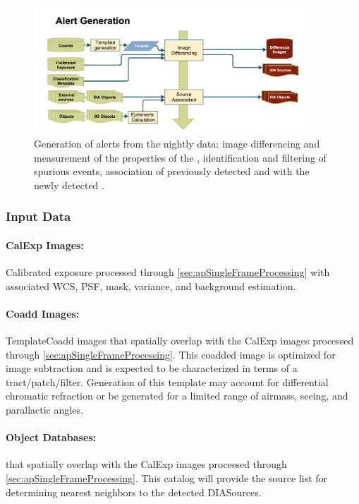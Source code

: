 \begin{figure}[th]
\begin{center}
\includegraphics[width=0.9\textwidth]{figures/Alert_Generation.png}
\caption{\label{fig:apAlertgen} Generation of alerts from the nightly data: image differencing and measurement of the properties of the \DIASources, identification and filtering of spurious events, association of previously detected \DIAObjects and \SSObjects with the newly detected \DIASources. }
\end{center}
\end{figure} 
\subsubsection{Input Data}
\label{sec:apADInput}

\paragraph*{CalExp Images:} Calibrated exposure processed through \ref{sec:apSingleFrameProcessing} with associated WCS, PSF, mask, variance, and background estimation.

\paragraph*{Coadd Images:} TemplateCoadd images that spatially overlap with the CalExp images processed through \ref{sec:apSingleFrameProcessing}. This coadded image is optimized for image subtraction and is expected to be characterized in terms of a tract/patch/filter. Generation of this template may account for differential chromatic refraction or be generated for a limited range of airmass, seeing, and parallactic angles.

\paragraph*{Object Databases:} \Objects that spatially overlap with the CalExp images processed through \ref{sec:apSingleFrameProcessing}. This \Object catalog will provide the source list for determining nearest neighbors to the detected DIASources. 

